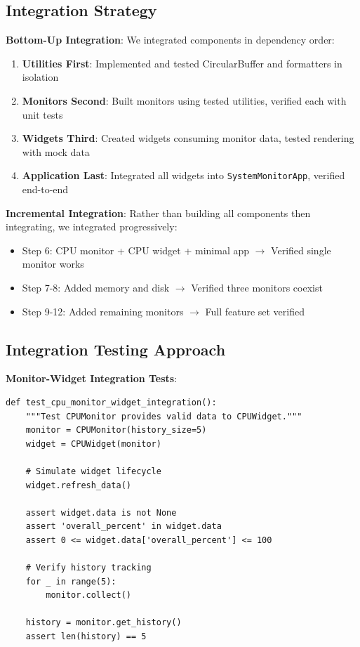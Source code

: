 \documentclass[12pt,a4paper,oneside]{report}
\begin{document}
\subsection{Integration Strategy}

\textbf{Bottom-Up Integration}: We integrated components in dependency order:
\begin{enumerate}
    \item \textbf{Utilities First}: Implemented and tested CircularBuffer and formatters in isolation
    \item \textbf{Monitors Second}: Built monitors using tested utilities, verified each with unit tests
    \item \textbf{Widgets Third}: Created widgets consuming monitor data, tested rendering with mock data
    \item \textbf{Application Last}: Integrated all widgets into \texttt{SystemMonitorApp}, verified end-to-end
\end{enumerate}

\textbf{Incremental Integration}: Rather than building all components then integrating, we integrated progressively:
\begin{itemize}
    \item Step 6: CPU monitor + CPU widget + minimal app $\rightarrow$ Verified single monitor works
    \item Step 7-8: Added memory and disk $\rightarrow$ Verified three monitors coexist
    \item Step 9-12: Added remaining monitors $\rightarrow$ Full feature set verified
\end{itemize}

\subsection{Integration Testing Approach}

\textbf{Monitor-Widget Integration Tests}:
\begin{lstlisting}
def test_cpu_monitor_widget_integration():
    """Test CPUMonitor provides valid data to CPUWidget."""
    monitor = CPUMonitor(history_size=5)
    widget = CPUWidget(monitor)
    
    # Simulate widget lifecycle
    widget.refresh_data()
    
    assert widget.data is not None
    assert 'overall_percent' in widget.data
    assert 0 <= widget.data['overall_percent'] <= 100
    
    # Verify history tracking
    for _ in range(5):
        monitor.collect()
    
    history = monitor.get_history()
    assert len(history) == 5
\end{lstlisting}
\end{document}
